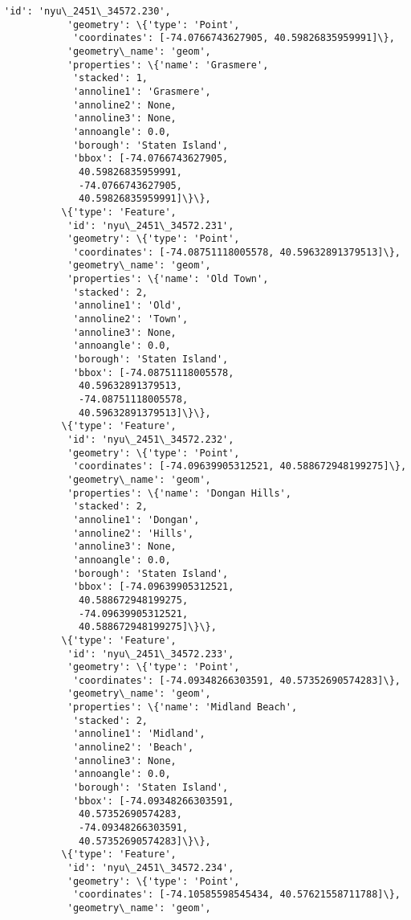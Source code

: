 \documentclass[11pt]{article}
\begin{document}
\begin{Verbatim}[commandchars=\\\{\}]
           'id': 'nyu\_2451\_34572.230',
           'geometry': \{'type': 'Point',
            'coordinates': [-74.0766743627905, 40.59826835959991]\},
           'geometry\_name': 'geom',
           'properties': \{'name': 'Grasmere',
            'stacked': 1,
            'annoline1': 'Grasmere',
            'annoline2': None,
            'annoline3': None,
            'annoangle': 0.0,
            'borough': 'Staten Island',
            'bbox': [-74.0766743627905,
             40.59826835959991,
             -74.0766743627905,
             40.59826835959991]\}\},
          \{'type': 'Feature',
           'id': 'nyu\_2451\_34572.231',
           'geometry': \{'type': 'Point',
            'coordinates': [-74.08751118005578, 40.59632891379513]\},
           'geometry\_name': 'geom',
           'properties': \{'name': 'Old Town',
            'stacked': 2,
            'annoline1': 'Old',
            'annoline2': 'Town',
            'annoline3': None,
            'annoangle': 0.0,
            'borough': 'Staten Island',
            'bbox': [-74.08751118005578,
             40.59632891379513,
             -74.08751118005578,
             40.59632891379513]\}\},
          \{'type': 'Feature',
           'id': 'nyu\_2451\_34572.232',
           'geometry': \{'type': 'Point',
            'coordinates': [-74.09639905312521, 40.588672948199275]\},
           'geometry\_name': 'geom',
           'properties': \{'name': 'Dongan Hills',
            'stacked': 2,
            'annoline1': 'Dongan',
            'annoline2': 'Hills',
            'annoline3': None,
            'annoangle': 0.0,
            'borough': 'Staten Island',
            'bbox': [-74.09639905312521,
             40.588672948199275,
             -74.09639905312521,
             40.588672948199275]\}\},
          \{'type': 'Feature',
           'id': 'nyu\_2451\_34572.233',
           'geometry': \{'type': 'Point',
            'coordinates': [-74.09348266303591, 40.57352690574283]\},
           'geometry\_name': 'geom',
           'properties': \{'name': 'Midland Beach',
            'stacked': 2,
            'annoline1': 'Midland',
            'annoline2': 'Beach',
            'annoline3': None,
            'annoangle': 0.0,
            'borough': 'Staten Island',
            'bbox': [-74.09348266303591,
             40.57352690574283,
             -74.09348266303591,
             40.57352690574283]\}\},
          \{'type': 'Feature',
           'id': 'nyu\_2451\_34572.234',
           'geometry': \{'type': 'Point',
            'coordinates': [-74.10585598545434, 40.57621558711788]\},
           'geometry\_name': 'geom',

\end{Verbatim}
\end{document}
